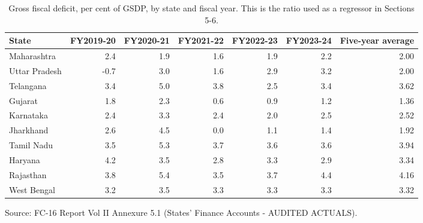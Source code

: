 \documentclass[12pt,a4paper]{article}
\begin{document}
\begin{table}[H]
\centering
\caption{Gross fiscal deficit, per cent of GSDP, by state and fiscal year. This is the ratio used as a regressor in Sections 5-6.}
\label{tab:2}
\footnotesize
\begin{adjustbox}{max width=\textwidth}
\begin{tabular}{@{}lrrrrrr@{}}
\toprule
State & FY2019-20 & FY2020-21 & FY2021-22 & FY2022-23 & FY2023-24 & Five-year average \\
\midrule
Maharashtra & 2.4 & 1.9 & 1.6 & 1.9 & 2.2 & 2.00 \\
Uttar Pradesh & -0.7 & 3.0 & 1.6 & 2.9 & 3.2 & 2.00 \\
Telangana & 3.4 & 5.0 & 3.8 & 2.5 & 3.4 & 3.62 \\
Gujarat & 1.8 & 2.3 & 0.6 & 0.9 & 1.2 & 1.36 \\
Karnataka & 2.4 & 3.3 & 2.4 & 2.0 & 2.5 & 2.52 \\
Jharkhand & 2.6 & 4.5 & 0.0 & 1.1 & 1.4 & 1.92 \\
Tamil Nadu & 3.5 & 5.3 & 3.7 & 3.6 & 3.6 & 3.94 \\
Haryana & 4.2 & 3.5 & 2.8 & 3.3 & 2.9 & 3.34 \\
Rajasthan & 3.8 & 5.4 & 3.5 & 3.7 & 4.4 & 4.16 \\
West Bengal & 3.2 & 3.5 & 3.3 & 3.3 & 3.3 & 3.32 \\
\bottomrule
\end{tabular}
\end{adjustbox}
\end{table}

Source: FC-16 Report Vol II Annexure 5.1 (States' Finance Accounts - AUDITED ACTUALS).
\end{document}
